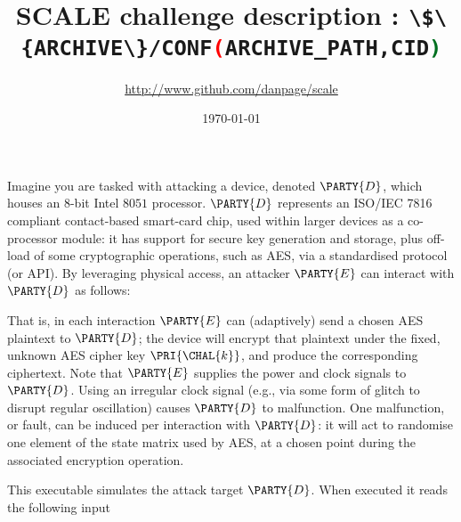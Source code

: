 \documentclass[crop={false},multi={true},tikz={true}]{standalone}
\begin{document}

\ifstandalone
\author{\url{http://www.github.com/danpage/scale}}
\title{\Large SCALE challenge description : \lstinline[language={bash}]|\$\{ARCHIVE\}/CONF(ARCHIVE_PATH,CID)|}
\date{\today}

\maketitle
\fi



Imagine you are tasked with attacking a device, denoted $\PARTY{D}$, 
which houses an $8$-bit Intel $8051$ processor.
$\PARTY{D}$ represents an ISO/IEC 7816 compliant contact-based smart-card
chip, used within larger devices as a co-processor module: it has support
for secure key generation and storage, plus off-load of some cryptographic 
operations, such as AES, via a standardised protocol (or API).
By leveraging physical access, 
an attacker $\PARTY{E}$ can interact with $\PARTY{D}$ as follows:

\begin{center}

\end{center}

\noindent
That is, in each interaction $\PARTY{E}$ can (adaptively) send 
a chosen AES  plaintext
to $\PARTY{D}$; the device will
encrypt that  plaintext under the fixed, unknown AES cipher key $\PRI{\CHAL{k}}$,
and produce 
the corresponding ciphertext.
Note that $\PARTY{E}$ supplies the power and clock signals to $\PARTY{D}$.
Using an irregular clock signal (e.g., via some form of glitch to disrupt 
regular oscillation) causes $\PARTY{D}$ to malfunction.  One malfunction, 
or fault, can be induced per interaction with $\PARTY{D}$: it will act to 
randomise one element of the state matrix used by AES, at a chosen point 
during the associated encryption operation.




This executable simulates the attack target $\PARTY{D}$.  When executed it 
reads the following input
\end{document}
